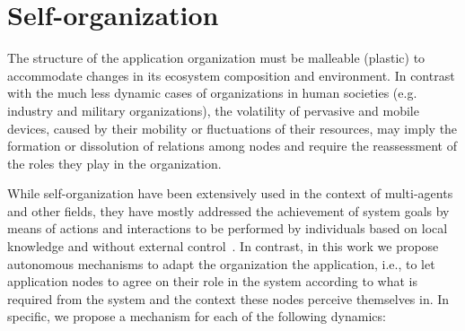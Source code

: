 \section{Self-organization}\label{sec:self_organization}




The structure of the application organization
must be malleable (plastic) to accommodate changes in its ecosystem composition and environment. In contrast with the much less dynamic cases of organizations in human societies (e.g. industry and military organizations), the volatility of pervasive and mobile devices, caused by their mobility or fluctuations of their resources, may imply the formation or dissolution of relations among nodes and require the reassessment of the roles they play in the organization. 

While self-organization have been extensively used in the context of multi-agents and other fields, they have mostly addressed the achievement of system goals by means of actions and interactions to be performed by individuals based on local knowledge and without external control~\cite{Banzhaf:2009}. In contrast, in this work we propose autonomous mechanisms to adapt the organization the application, i.e., to let application nodes to agree on their role in the system according to what is required from the system and the context these nodes perceive themselves in. In specific, we propose a mechanism for each of the following dynamics:


